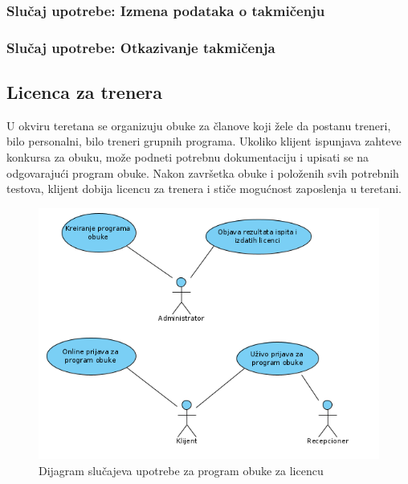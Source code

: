 \documentclass[a4paper]{article}
\begin{document}
\subsubsection{Slučaj upotrebe: Izmena podataka o takmičenju}


\subsubsection{Slučaj upotrebe: Otkazivanje takmičenja}



\newpage
\subsection{Licenca za trenera}

U okviru teretana se organizuju obuke za članove koji žele da postanu treneri, bilo personalni, bilo treneri grupnih programa. Ukoliko klijent ispunjava zahteve konkursa za obuku, može podneti potrebnu dokumentaciju i upisati se na odgovarajući program obuke. Nakon završetka obuke i položenih svih potrebnih testova, klijent dobija licencu za trenera i stiče mogućnost zaposlenja u teretani.

\begin{figure}[!ht]
\begin{center}
\includegraphics[scale=0.55]{sections/images/slucajevi_upotrebe_za_licencu.png}
\end{center}
\caption{Dijagram slučajeva upotrebe za program obuke za licencu}
\label{fig:kontekst}
\end{figure}
\end{document}
